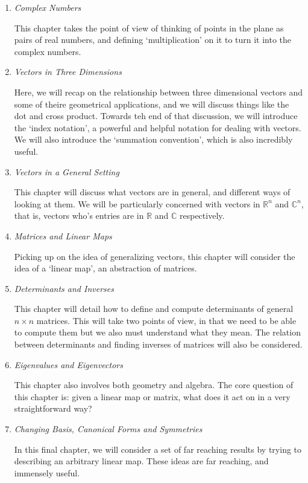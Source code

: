 \documentclass[a4]{scrartcl}
\begin{document}
\begin{enumerate}
	\item \emph{Complex Numbers}

	This chapter takes the point of view of thinking of points in the plane as pairs of real numbers, and defining `multiplication' on it to turn it into the complex numbers.

	\item \emph{Vectors in Three Dimensions}
	
	Here, we will recap on the relationship between three dimensional vectors and some of theire geometrical applications, and we will discuss things like the dot and cross product. Towards teh end of that discussion, we will introduce the `index notation', a powerful and helpful notation for dealing with vectors. We will also introduce the `summation convention', which is also incredibly useful.

	\item \emph{Vectors in a General Setting}
	
	This chapter will discuss what vectors are in general, and different ways of looking at them. We will be particularly concerned with vectors in $\mathbb{R}^n$ and $\mathbb{C}^n$, that is, vectors who's entries are in $\mathbb{R}$ and $\mathbb{C}$ respectively.

	\item \emph{Matrices and Linear Maps}
	
	Picking up on the idea of generalizing vectors, this chapter will consider the idea of a `linear map', an abstraction of matrices. 

	\item \emph{Determinants and Inverses}
	
	This chapter will detail how to define and compute determinants of general $n \times n$ matrices. This will take two points of view, in that we need to be able to compute them but we also must understand what they mean. The relation between determinants and finding inverses of matrices will also be considered.

	\item \emph{Eigenvalues and Eigenvectors}
	
	This chapter also involves both geometry and algebra. The core question of this chapter is: given a linear map or matrix, what does it act on in a very straightforward way?

	\item \emph{Changing Basis, Canonical Forms and Symmetries}
	
	In this final chapter, we will consider a set of far reaching results by trying to describing an arbitrary linear map. These ideas are far reaching, and immensely useful.
\end{enumerate}
\end{document}
